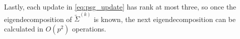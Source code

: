 \documentclass[10pt,a4paper]{amsart}
\theoremstyle{plain}
\theoremstyle{remark}
\def\hat#1{\widehat{#1}}
\def\tilde#1{\widetilde{#1}}
\let\norm\undefined %
\DeclarePairedDelimiter\norm{\lVert}{\rVert}
\renewcommand{\Pr}{\mathbb{P}}  %
\begin{document}

\smallskip
Lastly, each update in \cref{eq:psg_update} has rank at most three, so once the eigendecomposition of $\tilde\Sigma^{(k)}$ is known, the next eigendecomposition can be calculated in $O(p^{2})$ operations.
\end{document}
